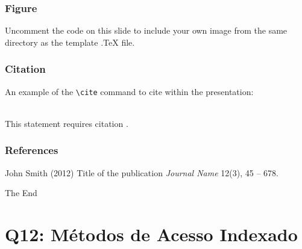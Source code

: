 \documentclass{beamer}
\begin{document}

\begin{frame}
\frametitle{Figure}
Uncomment the code on this slide to include your own image from the same directory as the template .TeX file.
\end{frame}


\begin{frame}[fragile] %
\frametitle{Citation}
An example of the \verb|\cite| command to cite within the presentation:\\~

This statement requires citation \cite{p1}.
\end{frame}


\begin{frame}
\frametitle{References}
\footnotesize{
\begin{thebibliography}{99} %
 John Smith (2012)
\newblock Title of the publication
\newblock \emph{Journal Name} 12(3), 45 -- 678.
\end{thebibliography}
}
\end{frame}


\begin{frame}
\Huge{\centerline{The End}}
\end{frame}


\section{Q12: Métodos de Acesso Indexado}
\end{document}
